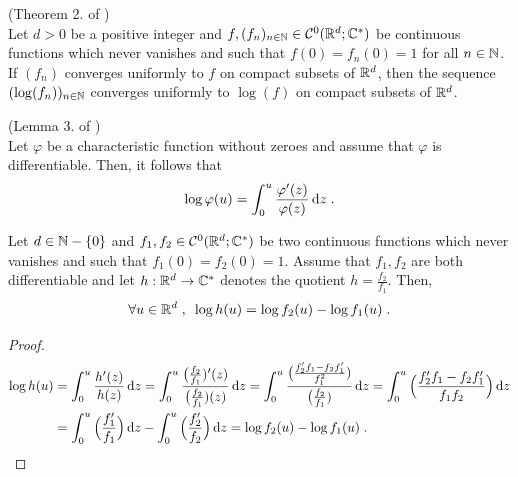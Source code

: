 \begin{proposition}(Theorem 2. of \cite{finkelstein1999extinguishing}) 
\label{finkelstein1999extinguishing_thm2}\\
Let $d > 0$ be a positive integer and $f, (f_n)_{n \in \mathbb{N}} \in \mathcal{C}^0(\mathbb{R}^d; \mathbb{C}^*)$ be continuous functions which never vanishes and such that $f(0) = f_n(0)= 1$ for all $n \in \mathbb{N}$. If $(f_n)$ converges uniformly to $f$ on compact subsets of $\mathbb{R}^d$, then the sequence $(\log(f_n))_{n \in \mathbb{N}}$ converges uniformly to $\log(f)$ on compact subsets of $\mathbb{R}^d$. 
\end{proposition}

\begin{proposition}(Lemma 3. of \cite{duval2017nonparametric})
\label{duval2017nonparametric_lm3}\\
Let $\varphi$ be a characteristic function without zeroes and assume that $\varphi$ is differentiable. Then, it follows that
	\begin{equation*}
	\log \varphi (u ) = \int_0^u \frac{\varphi'(z)}{\varphi(z)} \, \mathrm dz
	\; .
	\end{equation*}
\end{proposition}

\begin{corollary}
Let $d \in \mathbb{N} - \{0\}$ and $f_1, f_2 \in \mathcal{C}^0(\mathbb{R}^d; \mathbb{C}^*)$ be two continuous functions which never vanishes and such that $f_1(0) = f_2(0) = 1$. Assume that $f_1, f_2$ are both differentiable and let $h: \mathbb{R}^d \to \mathbb{C}^* $ denotes the quotient $h = \frac{f_2}{f_1}$. 
Then, 
	\begin{equation*}
	\forall u \in \mathbb{R}^d
	\; , \enspace
	\log h(u) = \log f_2(u) - \log f_1(u)
	\; .
	\end{equation*}
\end{corollary}
\begin{proof}
\begin{align*}
    \log h(u) 
    &= \int_0^u \frac{h'(z)}{h(z)} \, \mathrm dz
    = \int_0^u \frac{\big(\frac{f_2}{f_1})'(z)}{\big(\frac{f_2}{f_1})(z)} \, \mathrm dz
    =
    \int_0^u \frac{\big(\frac{f_2' f_1 - f_2 f_1'}{f_1^2})}{\big(\frac{f_2}{f_1})} \, \mathrm dz
    =    \int_0^u \Big(\frac{f_2' f_1 - f_2 f_1'}{f_1 f_2}\Big) \, \mathrm dz  \\
    &=  \int_0^u \Big(\frac{f_1' }{f_1}\Big) \, \mathrm dz -  \int_0^u \Big(\frac{ f_2'}{f_2}\Big) \, \mathrm dz 
    = \log f_2(u) - \log f_1(u) 
    \; .
\end{align*}
\end{proof}



